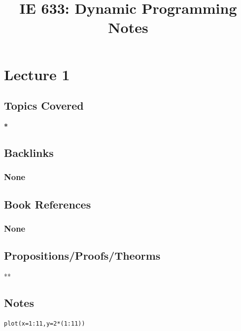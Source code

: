 \documentclass[11pt]{article}
\date{}
\title{IE 633: Dynamic Programming Notes}
\begin{document}
\maketitle

\section*{Lecture 1}
\label{sec:org21e35cf}
\subsection*{Topics Covered}
\label{sec:org005fdf0}
\textbf{*}
\subsection*{Backlinks}
\label{sec:orgaf32172}
\subsubsection*{None}
\label{sec:org23e0df9}
\subsection*{Book References}
\label{sec:org3d06b12}
\subsubsection*{None}
\label{sec:org37b6bad}
\subsection*{Propositions/Proofs/Theorms}
\label{sec:org185fa1f}
**
\subsection*{Notes}
\label{sec:org30609df}

\begin{verbatim}
plot(x=1:11,y=2*(1:11))
\end{verbatim}
\end{document}
